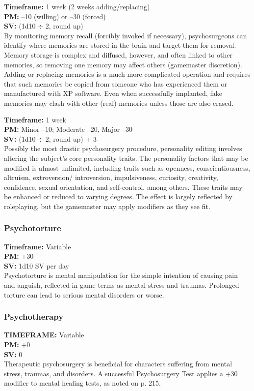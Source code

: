  \textbf{Timeframe:} 1 week (2 weeks adding/replacing) \\ \textbf{PM:} –10 (willing) or –30 (forced) \\ \textbf{SV:} (1d10 $\div$ 2, round up) \\ By monitoring memory recall (forcibly invoked if necessary), psychosurgeons can identify where memories are stored in the brain and target them for removal. Memory storage is complex and diffused, however, and often linked to other memories, so removing one memory may affect others (gamemaster discretion). Adding or replacing memories is a much more complicated operation and requires that such memories be copied from someone who has experienced them or manufactured with XP software. Even when successfully implanted, fake memories may clash with other (real) memories unless those are also erased. 

 \textbf{Timeframe:} 1 week \\ \textbf{PM:} Minor –10; Moderate –20, Major –30 \\ \textbf{SV:} (1d10 $\div$ 2, round up) + 3 \\ Possibly the most drastic psychosurgery procedure, personality editing involves altering the subject’s core personality traits. The personality factors that may be modified is almost unlimited, including traits such as openness, conscientiousness, altruism, extroversion/ introversion, impulsiveness, curiosity, creativity, confidence, sexual orientation, and self-control, among others. These traits may be enhanced or reduced to varying degrees. The effect is largely reflected by roleplaying, but the gamemaster may apply modifiers as they see fit. 

\subsubsection{Psychotorture} \textbf{Timeframe:} Variable \\ \textbf{PM:} +30 \\ \textbf{SV:} 1d10 SV per day \\ Psychotorture is mental manipulation for the simple intention of causing pain and anguish, reflected in game terms as mental stress and traumas. Prolonged torture can lead to serious mental disorders or worse. 

\subsubsection{Psychotherapy} \textbf{TIMEFRAME:} Variable \\ \textbf{PM:} +0 \\ \textbf{SV:} 0 \\ Therapeutic psychosurgery is beneficial for characters suffering from mental stress, traumas, and disorders. A successful Psychosurgery Test applies a +30 modifier to mental healing tests, as noted on p. 215. 


